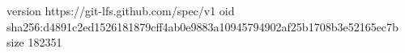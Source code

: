 version https://git-lfs.github.com/spec/v1
oid sha256:d4891c2ed1526181879cff4ab0e9883a10945794902af25b1708b3e52165ec7b
size 182351
